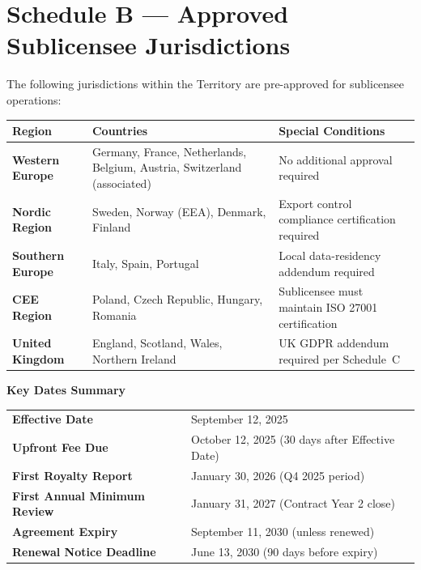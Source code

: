 \documentclass[11pt,a4paper]{article}
\begin{document}
\vspace{20pt}

\section*{\color{NexaNavy}Schedule B — Approved Sublicensee Jurisdictions}

The following jurisdictions within the Territory are pre-approved for sublicensee operations:

\vspace{6pt}
\noindent
\begin{tabularx}{\textwidth}{>{\bfseries}l X X}
  \toprule
  \rowcolor{NexaNavy}
  \color{white}\textbf{Region} & \color{white}\textbf{Countries} &
  \color{white}\textbf{Special Conditions} \\
  \midrule
  Western Europe &
    Germany, France, Netherlands, Belgium, Austria, Switzerland (associated) &
    No additional approval required \\[4pt]
  \rowcolor{NexaIce}
  Nordic Region &
    Sweden, Norway (EEA), Denmark, Finland &
    Export control compliance certification required \\[4pt]
  Southern Europe &
    Italy, Spain, Portugal &
    Local data-residency addendum required \\[4pt]
  \rowcolor{NexaIce}
  CEE Region &
    Poland, Czech Republic, Hungary, Romania &
    Sublicensee must maintain ISO 27001 certification \\[4pt]
  United Kingdom &
    England, Scotland, Wales, Northern Ireland &
    UK GDPR addendum required per Schedule~C \\
  \bottomrule
\end{tabularx}

\vspace{20pt}

\begin{tcolorbox}[
  enhanced,
  colback=NexaNavy!4,
  colframe=NexaGold,
  boxrule=1pt,
  arc=3pt,
  left=12pt, right=12pt, top=10pt, bottom=10pt
]
\small\color{NexaText}
\textbf{\color{NexaNavy}\faCalendar\enspace Key Dates Summary}

\vspace{6pt}
\begin{tabularx}{\linewidth}{l X}
  \textbf{Effective Date} & September 12, 2025 \\[3pt]
  \textbf{Upfront Fee Due} & October 12, 2025 (30 days after Effective Date) \\[3pt]
  \textbf{First Royalty Report} & January 30, 2026 (Q4 2025 period) \\[3pt]
  \textbf{First Annual Minimum Review} & January 31, 2027 (Contract Year 2 close) \\[3pt]
  \textbf{Agreement Expiry} & September 11, 2030 (unless renewed) \\[3pt]
  \textbf{Renewal Notice Deadline} & June 13, 2030 (90 days before expiry) \\
\end{tabularx}
\end{tcolorbox}
\end{document}
